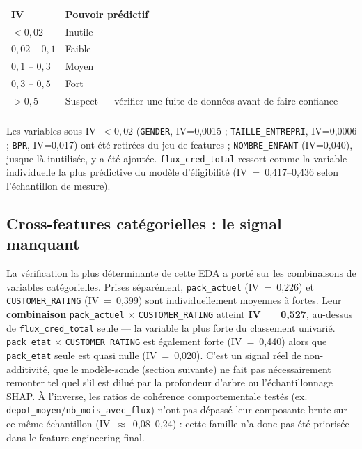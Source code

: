 \documentclass[11pt,a4paper]{report}
\let\oldtoprule\toprule
\renewcommand{\toprule}{\arrayrulecolor{corpslate}\oldtoprule\arrayrulecolor{black}}
\let\oldmidrule\midrule
\renewcommand{\midrule}{\arrayrulecolor{emsigreen}\oldmidrule\arrayrulecolor{black}}
\let\oldbottomrule\bottomrule
\renewcommand{\bottomrule}{\arrayrulecolor{corpslate}\oldbottomrule\arrayrulecolor{black}}
\begin{document}
\begin{center}
\begin{tabular}{@{}ll@{}}
\toprule
\rowcolor{corpslate!10}
\textbf{IV} & \textbf{Pouvoir prédictif} \\
\midrule
$< 0,02$ & Inutile \\
$0,02$ -- $0,1$ & Faible \\
$0,1$ -- $0,3$ & Moyen \\
$0,3$ -- $0,5$ & Fort \\
$> 0,5$ & Suspect — vérifier une fuite de données avant de faire confiance \\
\bottomrule
\end{tabular}
\end{center}

Les variables sous IV~$<0,02$ (\texttt{GENDER}, IV=0,0015 ;
\texttt{TAILLE\_ENTREPRI}, IV=0,0006 ; \texttt{BPR}, IV=0,017) ont été
retirées du jeu de features ; \texttt{NOMBRE\_ENFANT} (IV=0,040),
jusque-là inutilisée, y a été ajoutée. \texttt{flux\_cred\_total}
ressort comme la variable individuelle la plus prédictive du modèle
d'éligibilité (IV~=~0,417--0,436 selon l'échantillon de mesure).

\subsection{Cross-features catégorielles : le signal manquant}
La vérification la plus déterminante de cette EDA a porté sur les
combinaisons de variables catégorielles. Prises séparément,
\texttt{pack\_actuel} (IV~=~0,226) et \texttt{CUSTOMER\_RATING}
(IV~=~0,399) sont individuellement moyennes à fortes. Leur
\textbf{combinaison} \texttt{pack\_actuel} $\times$
\texttt{CUSTOMER\_RATING} atteint \textbf{IV~=~0,527}, au-dessus de
\texttt{flux\_cred\_total} seule — la variable la plus forte du classement
univarié. \texttt{pack\_etat} $\times$ \texttt{CUSTOMER\_RATING} est
également forte (IV~=~0,440) alors que \texttt{pack\_etat} seule est
quasi nulle (IV~=~0,020). C'est un signal réel de non-additivité, que le
modèle-sonde (section suivante) ne fait pas nécessairement remonter tel
quel s'il est dilué par la profondeur d'arbre ou l'échantillonnage SHAP.
À l'inverse, les ratios de cohérence comportementale testés (ex.
\texttt{depot\_moyen}/\texttt{nb\_mois\_avec\_flux}) n'ont pas dépassé
leur composante brute sur ce même échantillon (IV~$\approx$~0,08--0,24) :
cette famille n'a donc pas été priorisée dans le feature engineering
final.
\end{document}
